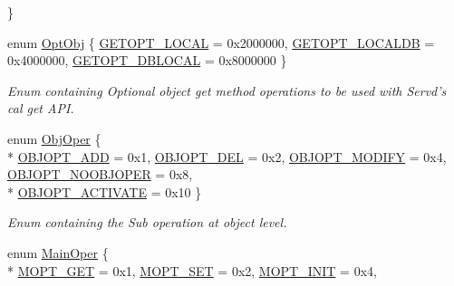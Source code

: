 \begin{DoxyCompactItemize}
 \}
\item 
enum \hyperlink{group__LIBHELP_gabbfae400f613b8339e81ef9427321b84}{Opt\-Obj} \{ \hyperlink{group__LIBHELP_ggabbfae400f613b8339e81ef9427321b84a928525dbc0377081b284b65e05f0d847}{G\-E\-T\-O\-P\-T\-\_\-\-L\-O\-C\-A\-L} = 0x2000000, 
\hyperlink{group__LIBHELP_ggabbfae400f613b8339e81ef9427321b84a20f7a4e52b4d0ab8b1ba48fb5bf5171d}{G\-E\-T\-O\-P\-T\-\_\-\-L\-O\-C\-A\-L\-D\-B} = 0x4000000, 
\hyperlink{group__LIBHELP_ggabbfae400f613b8339e81ef9427321b84adce980e4fb9feed0b4747e8b3a75f122}{G\-E\-T\-O\-P\-T\-\_\-\-D\-B\-L\-O\-C\-A\-L} = 0x8000000
 \}
\begin{DoxyCompactList}\small\item\em Enum containing Optional object get method operations to be used with Servd's cal get A\-P\-I. \end{DoxyCompactList}\item 
enum \hyperlink{group__LIBHELP_ga63865642181d8ac749852d657efc4bd8}{Obj\-Oper} \{ \\*
\hyperlink{group__LIBHELP_gga63865642181d8ac749852d657efc4bd8aaabb1855853c165aaee5ce4f600db21d}{O\-B\-J\-O\-P\-T\-\_\-\-A\-D\-D} = 0x1, 
\hyperlink{group__LIBHELP_gga63865642181d8ac749852d657efc4bd8a53957d1b2b91ebb970527d1d7c86bbba}{O\-B\-J\-O\-P\-T\-\_\-\-D\-E\-L} = 0x2, 
\hyperlink{group__LIBHELP_gga63865642181d8ac749852d657efc4bd8a946d7d6d203768b5ccb9fb64d66009f0}{O\-B\-J\-O\-P\-T\-\_\-\-M\-O\-D\-I\-F\-Y} = 0x4, 
\hyperlink{group__LIBHELP_gga63865642181d8ac749852d657efc4bd8abadd23813b0d7abf14f8ecc76f381140}{O\-B\-J\-O\-P\-T\-\_\-\-N\-O\-O\-B\-J\-O\-P\-E\-R} = 0x8, 
\\*
\hyperlink{group__LIBHELP_gga63865642181d8ac749852d657efc4bd8ac8d0d094247d75b15be20de57af72617}{O\-B\-J\-O\-P\-T\-\_\-\-A\-C\-T\-I\-V\-A\-T\-E} = 0x10
 \}
\begin{DoxyCompactList}\small\item\em Enum containing the Sub operation at object level. \end{DoxyCompactList}\item 
enum \hyperlink{group__LIBHELP_ga0cdba030aaa0bd18b24dbf19b06877a0}{Main\-Oper} \{ \\*
\hyperlink{group__LIBHELP_gga0cdba030aaa0bd18b24dbf19b06877a0aa2e0913dec5e220b92f791525e132735}{M\-O\-P\-T\-\_\-\-G\-E\-T} = 0x1, 
\hyperlink{group__LIBHELP_gga0cdba030aaa0bd18b24dbf19b06877a0ac23667be630f90a58d53d02b11d7340f}{M\-O\-P\-T\-\_\-\-S\-E\-T} = 0x2, 
\hyperlink{group__LIBHELP_gga0cdba030aaa0bd18b24dbf19b06877a0a2c480dff14f2d427e0918620ecc2b99f}{M\-O\-P\-T\-\_\-\-I\-N\-I\-T} = 0x4, 

\end{DoxyCompactItemize}
